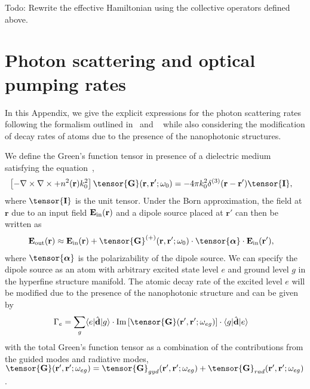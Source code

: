 \documentclass[pra,twocolumn,floatfix,superscriptaddress]{revtex4-1} %
\def\br{\mathbf{r}}
\def\bra#1{\langle{#1}\rvert}%
\def\ket#1{\lvert{#1}\rangle}%
\newcommand{\mbf}[1]{\mathbf{#1}}
\newcommand{\inp}{{\rm in}}
\newcommand{\out}{{\rm out}}
\newcommand{\unittens}{\tensor{\mathbf{I}}}
\newcommand{\comment}[1]{{\color{Maroon} #1}}
\begin{document}
\begin{appendix}
\comment{Todo: Rewrite the effective Hamiltonian using the collective operators defined above.}

\section{Photon scattering and optical pumping rates} \label{Appendix::Rates}

In this Appendix, we give the explicit expressions for the photon scattering rates following the formalism outlined in~\cite{Deutsch2010a} and ~\cite{Qi2016} while also considering the modification of decay rates of atoms due to the presence of the nanophotonic structures. 

We define the Green's function tensor in presence of a dielectric medium satisfying the equation~\cite{Qi2016},
	\begin{align} \label{Eq::GreensDiffEq}
		\left[ -\nabla\times\nabla\times + n^2(\mbf{r}) k_0^2 \right] \tensor{\mathbf{G}}(\br, \br';\omega_0) &= -4\pi 
k_0^2 \delta^{(3)}(\mathbf{r}-\mathbf{r}') \unittens,
	\end{align}
where $\unittens$ is the unit tensor.
Under the Born approximation, the field at $\br$ due to an input field $ \mathbf{E}_{\inp}(\br) $ and a dipole source placed at $\br'$ can then be written as
\begin{align}
		\mathbf{E}_{\out}(\br) 
		&\approx \mathbf{E}_{\inp}(\br)+ \tensor{\mathbf{G}}^{(+)}(\br , \br'; \omega_0) \cdot 
\tensor{\boldsymbol{\alpha}}\cdot \mathbf{E}_{\inp}(\br'), \label{Eq::ScatteredField}
\end{align}
where $ \tensor{\boldsymbol{\alpha}} $ is the polarizability of the dipole source.
We can specify the dipole source as an atom with arbitrary excited state level $ e $ and ground level $ g $ in the hyperfine structure manifold. 
The atomic decay rate of the excited level $ e $ will be modified due to the presence of the nanophotonic structure and can be given by
\begin{align}
\Gamma_e &= \sum_g \bra{e}\hat{\mathbf{d}}\ket{g} \cdot \mathrm{Im}\left[\tensor{\mathbf{G}}(\br',\br';\omega_{eg}) \right]\cdot \bra{g}\hat{\mathbf{d}}\ket{e}
\end{align}
with the total Green's function tensor as a combination of the contributions from the guided modes and radiative modes, $ \tensor{\mathbf{G}}(\br',\br';\omega_{eg})=\tensor{\mathbf{G}}_{gyd}(\br',\br';\omega_{eg})+\tensor{\mathbf{G}}_{rad}(\br',\br';\omega_{eg}) $.

\end{appendix}
\end{document}
